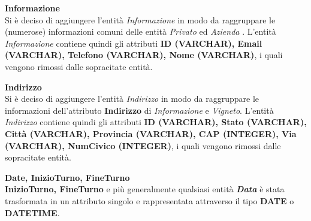 \textbf{\large{Informazione}}\\
Si è deciso di aggiungere l'entità \emph{Informazione} in modo da raggruppare le (numerose) informazioni comuni delle entità \emph{Privato} ed \emph{Azienda} . L'entità \emph{Informazione} contiene quindi gli attributi \textbf{ID (VARCHAR), Email (VARCHAR), Telefono (VARCHAR), Nome (VARCHAR)}, i quali vengono rimossi dalle sopracitate entità.

\begin{flushleft}
\textbf{\large{Indirizzo}}\\
Si è deciso di aggiungere l'entità \emph{Indirizzo} in modo da raggruppare le informazioni dell'attributo \textbf{Indirizzo} di \emph{Informazione} e \emph{Vigneto}. L'entità \emph{Indirizzo} contiene quindi gli attributi \textbf{ID (VARCHAR), Stato (VARCHAR), Città (VARCHAR), Provincia (VARCHAR), CAP (INTEGER), Via (VARCHAR), NumCivico (INTEGER)}, i quali vengono rimossi dalle sopracitate entità.
\end{flushleft}

\begin{flushleft}
\textbf{\large{Date, InizioTurno, FineTurno}}\\
\textbf{InizioTurno, FineTurno} e più generalmente qualsiasi entità \textbf{\emph{Data}} è stata trasformata in un attributo singolo e rappresentata attraverso il tipo \textbf{DATE} o \textbf{DATETIME}.
\end{flushleft}
